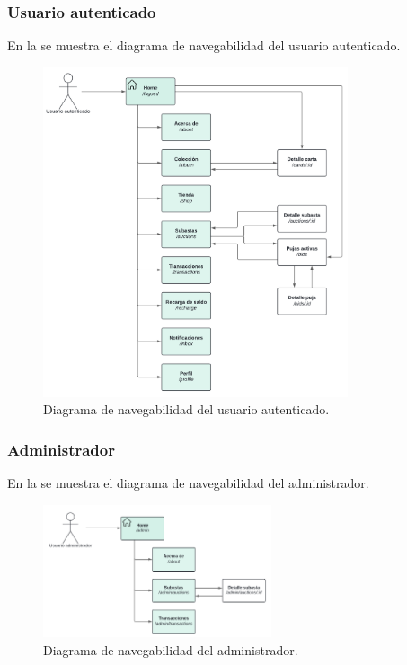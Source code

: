 \subsubsection{Usuario autenticado}
En la  se muestra el diagrama de navegabilidad del usuario autenticado.

\begin{figure}[H]
    \centering
    \includegraphics[width=0.8\textwidth]{figures/6-Analisis/6-Interfaz/navegabilidad-standard.png}
    \caption{Diagrama de navegabilidad del usuario autenticado.}
    \hypertarget{fig:navegabilidad-usuario-autenticado}{}
    \label{fig:navegabilidad-usuario-autenticado}
\end{figure}

\subsubsection{Administrador}
En la  se muestra el diagrama de navegabilidad del administrador.

\begin{figure}[H]
    \centering
    \includegraphics[width=0.6\textwidth]{figures/6-Analisis/6-Interfaz/navegabilidad-admin.png}
    \caption{Diagrama de navegabilidad del administrador.}
    \hypertarget{fig:navegabilidad-administrador}{}
    \label{fig:navegabilidad-administrador}
\end{figure}